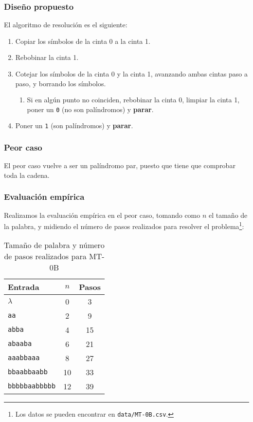 \subsubsection*{Diseño propuesto}
El algoritmo de resolución es el siguiente:

\begin{enumerate}
    \item Copiar los símbolos de la cinta 0 a la cinta 1.
    \item Rebobinar la cinta 1.
    \item Cotejar los símbolos de la cinta 0 y la cinta 1, avanzando ambas cintas paso a paso, y borrando los símbolos.
    \begin{enumerate}[1.]
        \item Si en algún punto no coinciden, rebobinar la cinta 0, limpiar la cinta 1, poner un \texttt{0} (no son palíndromos) y \textbf{parar}.
    \end{enumerate}
    \item Poner un \texttt{1} (son palíndromos) y \textbf{parar}.
\end{enumerate}




\subsubsection*{Peor caso}
El peor caso vuelve a ser un palíndromo par, puesto que tiene que comprobar toda la cadena.

\subsubsection*{Evaluación empírica}
Realizamos la evaluación empírica en el peor caso, tomando como $n$ el tamaño de la palabra, y midiendo el número de pasos realizados para resolver el problema\footnote{Los datos se pueden encontrar en \texttt{data/MT-0B.csv}.}:

\begin{table}[h]
    \centering
    \begin{tabular}{lcc}
        Entrada & $n$ & Pasos \\
        \hline
        $\lambda$               & 0  & 3  \\
        \texttt{aa}             & 2  & 9  \\
        \texttt{abba}           & 4  & 15 \\
        \texttt{abaaba}         & 6  & 21 \\
        \texttt{aaabbaaa}       & 8  & 27 \\
        \texttt{bbaabbaabb}     & 10 & 33 \\
        \texttt{bbbbbaabbbbb}   & 12 & 39
    \end{tabular}
    \caption{Tamaño de palabra y número de pasos realizados para MT-0B}
\end{table}


